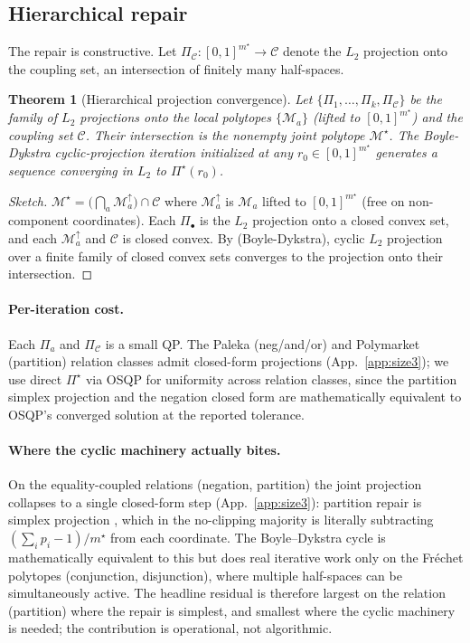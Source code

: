 \documentclass{article}
\theoremstyle{plain}
\newtheorem{theorem}{Theorem}[section]
\theoremstyle{definition}
\theoremstyle{remark}
\newcommand{\Mloc}{\mathcal{M}_a}
\newcommand{\Mjoint}{\mathcal{M}^{\star}}
\newcommand{\Pijoint}{\Pi^{\star}}
\newcommand{\Cset}{\mathcal{C}}
\begin{document}
\subsection{Hierarchical repair}
\label{sec:hier}

The repair is constructive. Let
$\Pi_\Cset: [0,1]^{m^\star}\to \Cset$ denote the $L_2$ projection
onto the coupling set, an intersection of finitely many
half-spaces.

\begin{theorem}[Hierarchical projection convergence]
\label{thm:dykstra}
Let $\{\Pi_1,\dots,\Pi_k,\Pi_\Cset\}$ be the family of $L_2$
projections onto the local polytopes $\{\Mloc\}$ (lifted to
$[0,1]^{m^\star}$) and the coupling set $\Cset$. Their intersection
is the nonempty joint polytope $\Mjoint$. The Boyle-Dykstra
cyclic-projection iteration
\citep{boyle1986dykstra} initialized at any $r_0 \in [0,1]^{m^\star}$
generates a sequence converging in $L_2$ to $\Pijoint(r_0)$.
\end{theorem}

\begin{proof}[Sketch]
$\Mjoint = \bigl(\bigcap_a \Mloc^{\uparrow}\bigr) \cap \Cset$ where
$\Mloc^{\uparrow}$ is $\Mloc$ lifted to $[0,1]^{m^\star}$ (free on
non-component coordinates). Each $\Pi_\bullet$ is the
$L_2$ projection onto a closed convex set, and each $\Mloc^{\uparrow}$
and $\Cset$ is closed convex. By
\citet[Thm.~9.31]{bauschke2017convex} (Boyle-Dykstra), cyclic
$L_2$ projection over a finite family of closed convex sets
converges to the projection onto their intersection.
\end{proof}

\paragraph{Per-iteration cost.}
Each $\Pi_a$ and $\Pi_\Cset$ is a small QP. The Paleka (neg/and/or)
and Polymarket (partition) relation classes admit closed-form
projections (App.~\ref{app:size3}); we use direct $\Pijoint$ via
\textsc{OSQP} \citep{stellato2020osqp} for uniformity across
relation classes, since the partition simplex projection and the
negation closed form are mathematically equivalent to OSQP's
converged solution at the reported tolerance.

\paragraph{Where the cyclic machinery actually bites.}
On the equality-coupled relations (negation, partition) the joint
projection collapses to a single closed-form step
(App.~\ref{app:size3}): partition repair is simplex projection
\citep{wang2013simplex}, which in the no-clipping majority is
literally subtracting $(\sum_i p_i\!-\!1)/m^\star$ from each
coordinate. The Boyle--Dykstra cycle is mathematically equivalent to
this but does real iterative work only on the Fr\'echet polytopes
(conjunction, disjunction), where multiple half-spaces can be
simultaneously active. The headline residual is therefore largest
on the relation (partition) where the repair is simplest, and
smallest where the cyclic machinery is needed; the contribution is
operational, not algorithmic.
\end{document}
